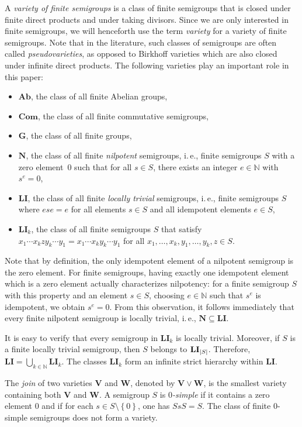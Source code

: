 \documentclass[11pt]{article}
\numberwithin{equation}{section}
\theoremstyle{definition}
\theoremstyle{plain}
\newcommand{\N}{\mathbb N}
\newcommand{\ie}{i.\,e.}
\newcommand{\abs}[1]{\ensuremath\left|#1\right|}
\newcommand{\os}[1]{\ensuremath{\left\{#1\right\}}}
\newcommand{\vV}{\mathbf{V}}
\newcommand{\vW}{\mathbf{W}}
\newcommand{\vAb}{\mathbf{Ab}}
\newcommand{\vNil}{\mathbf{N}}
\newcommand{\vLI}{\mathbf{LI}}
\newcommand{\vCom}{\mathbf{Com}}
\newcommand{\vG}{\mathbf{G}}
\begin{document}
A \emph{variety of finite semigroups} is a class of finite semigroups that is
closed under finite direct products and under taking divisors.
%
Since we are only interested in finite semigroups, we will henceforth use the
term \emph{variety} for a variety of finite semigroups.
%
Note that in the literature, such classes of semigroups are often called
\emph{pseudovarieties}, as opposed to Birkhoff varieties which are also closed
under infinite direct products.
%
The following varieties play an important role in this paper:
%
\begin{itemize}
  \item $\vAb$, the class of all finite Abelian groups,
  \item $\vCom$, the class of all finite commutative semigroups,
  \item $\vG$, the class of all finite groups,
  \item $\vNil$, the class of all finite \emph{nilpotent} semigroups, \ie, finite
    semigroups $S$ with a zero element~$0$ such that for all $s \in S$, there
    exists an integer $e \in \N$ with $s^e = 0$,
  \item $\vLI$, the class of all finite \emph{locally trivial} semigroups, \ie,
    finite semigroups $S$ where $ese = e$ for all elements $s \in S$ and all
    idempotent elements $e \in S$,
  \item $\vLI_k$, the class of all finite semigroups $S$ that satisfy $x_1
    \cdots x_k z y_k \cdots y_1 = x_1 \cdots x_k y_k \cdots y_1$ for all $x_1,
    \dots, x_k, y_1, \dots, y_k, z \in S$.
\end{itemize}
%
Note that by definition, the only idempotent element of a nilpotent semigroup
is the zero element.
%
For finite semigroups, having exactly one idempotent element which is a zero
element actually characterizes nilpotency:
%
for a finite semigroup $S$ with this property and an element $s \in S$,
choosing $e \in \N$ such that $s^e$ is idempotent, we obtain $s^e = 0$.
%
{}From this observation, it follows immediately that every finite nilpotent
semigroup is locally trivial, \ie, $\vNil \subseteq \vLI$.
%

It is easy to verify that every semigroup in $\vLI_k$ is locally trivial.
Moreover, if $S$ is a finite locally trivial semigroup, then $S$ belongs to
$\vLI_{\abs{S}}$. Therefore, $\vLI = \bigcup_{k \in \N} \vLI_k$. The classes
$\vLI_k$ form an infinite strict hierarchy within $\vLI$.

The \emph{join} of two varieties $\vV$ and $\vW$, denoted by $\vV \lor \vW$, is
the smallest variety containing both $\vV$ and $\vW$.
%
A semigroup $S$ is \emph{$0$-simple} if it contains a zero element $0$ and if
for each $s \in S \setminus \os{0}$, one has $SsS = S$.
%
The class of finite $0$-simple semigroups does not form a variety.
\end{document}
